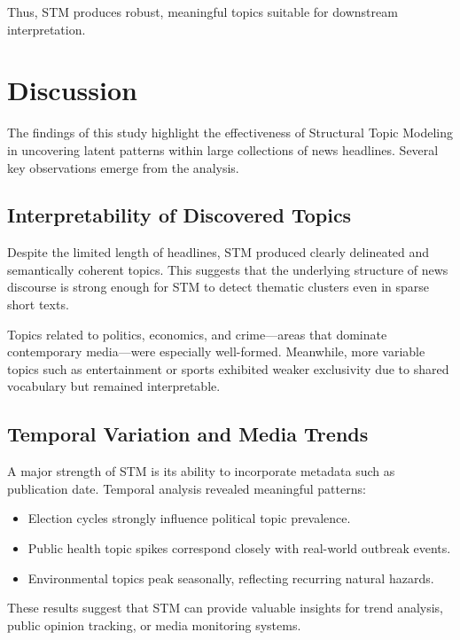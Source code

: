 \documentclass[11pt]{article}
\begin{document}
Thus, STM produces robust, meaningful topics suitable for downstream interpretation.

\section{Discussion}

The findings of this study highlight the effectiveness of Structural Topic Modeling in uncovering latent patterns within large collections of news headlines. Several key observations emerge from the analysis.

\subsection{Interpretability of Discovered Topics}

Despite the limited length of headlines, STM produced clearly delineated and semantically coherent topics. This suggests that the underlying structure of news discourse is strong enough for STM to detect thematic clusters even in sparse short texts.

Topics related to politics, economics, and crime—areas that dominate contemporary media—were especially well-formed. Meanwhile, more variable topics such as entertainment or sports exhibited weaker exclusivity due to shared vocabulary but remained interpretable.

\subsection{Temporal Variation and Media Trends}

A major strength of STM is its ability to incorporate metadata such as publication date. Temporal analysis revealed meaningful patterns:

\begin{itemize}
    \item Election cycles strongly influence political topic prevalence.
    \item Public health topic spikes correspond closely with real-world outbreak events.
    \item Environmental topics peak seasonally, reflecting recurring natural hazards.
\end{itemize}

These results suggest that STM can provide valuable insights for trend analysis, public opinion tracking, or media monitoring systems.
\end{document}
